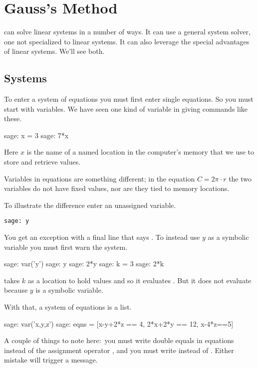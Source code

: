 \chapter{Gauss's Method}

\Sage{} can solve linear systems in a number of ways.
It can use a general system solver, one not specialized to linear
systems.
It can also leverage the special advantages of linear systems.
We'll see both. 



\section{Systems}
To enter a system of equations you must first enter single equations.
So you must start with variables.
We have seen one kind of variable in giving commands like these.
\begin{sagecommandline}
sage: x = 3
sage: 7*x
\end{sagecommandline}
Here $x$ is the name of a named location in the computer's memory
that we use to store and retrieve values.

Variables in equations are something different; in the equation
$C=2\pi\cdot r$ the two variables do not have fixed values, nor
are they tied to memory locations. 

To illustrate the difference enter an unassigned 
variable.
\begin{lstlisting}
sage: y
\end{lstlisting}
You get an exception with a final line that says
.
To instead use $y$ as a symbolic variable you must first
warn the system.
\begin{sagecommandline}
sage: var('y')
sage: y
sage: 2*y
sage: k = 3
sage: 2*k
\end{sagecommandline}
\noindent
\Sage{} takes $k$ as a location to hold
values and so it evaluates .
But it does not evaluate  because $y$ is a symbolic variable.

With that, a system of equations is a list.
\begin{sagecommandline}
sage: var('x,y,z')                                  
sage: eqns = [x-y+2*z == 4, 2*x+2*y == 12, x-4*z==5]
\end{sagecommandline}
\noindent
A couple of things to note here:~you 
must write double equals \inlinecode{==} in equations instead of 
the assignment operator \inlinecode{=}, 
and you must write 
instead of .
Either mistake will trigger a  
 message.

